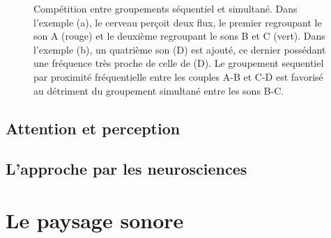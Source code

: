 \begin{figure}[bth]
        \myfloatalign
        \caption[Compétition entre groupements séquentiel et simultané]{Compétition entre groupements séquentiel et simultané. Dans l'exemple (a), le cerveau perçoit deux flux, le premier regroupant le son A (rouge) et le deuxième regroupant le sons B et C (vert). Dans l'exemple (b), un quatrième son (D) est ajouté, ce dernier possédant une fréquence très proche de celle de (D). Le groupement sequentiel par proximité fréquentielle entre les couples A-B et C-D est favorisé au détriment du groupement simultané entre les sons B-C.}\label{fig:simvsseq}
\end{figure}



\subsection{Attention et perception}

\subsection{L'approche par les neurosciences}

\section{Le paysage sonore}
\label{sec:paysageSonore}

